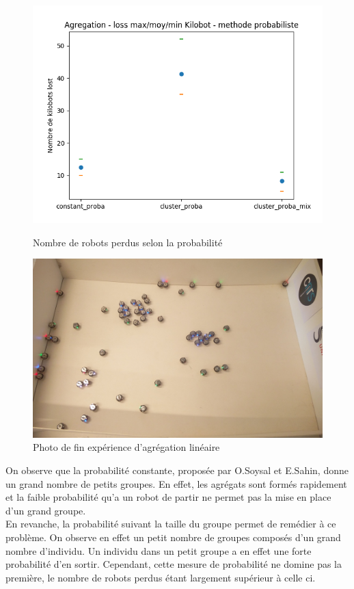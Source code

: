 \documentclass[a4paper]{article}
\begin{document}
\begin{figure}[h]
	\centering
	\begin{minipage}[c]{.46\linewidth}
		\centering
		\includegraphics[width=1.1\linewidth]{../../script_results/Agregation_nombre_lost.png}
		\caption{Nombre de robots perdus selon la probabilité}
	\end{minipage}
\hfill
	\begin{minipage}[c]{.45\linewidth}
	\centering
	\includegraphics[width=1.1\linewidth]{../../script_results/Resultats_aggregation_proba.jpg}
	\caption{Photo de fin expérience d'agrégation linéaire}
\end{minipage}
\end{figure}
\newpage
%
On observe que la probabilité constante, proposée par O.Soysal et E.Sahin, donne un grand nombre de petits groupes. En effet, les agrégats sont formés rapidement et la faible probabilité qu'a un robot de partir ne permet pas la mise en place d'un grand groupe.\\
En revanche, la probabilité suivant la taille du groupe permet de remédier à ce problème. On observe en effet un petit nombre de groupes composés d'un grand nombre d'individu. Un individu dans un petit groupe a en effet une forte probabilité d'en sortir. Cependant, cette mesure de probabilité ne domine pas la première, le nombre de robots perdus étant largement supérieur à celle ci.\\
\newpage
\end{document}
